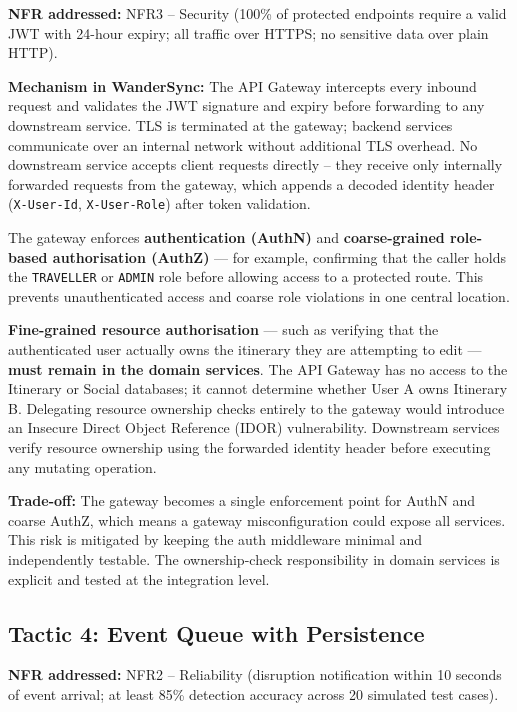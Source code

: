 \documentclass[12pt,a4paper]{article}
\begin{document}
\textbf{NFR addressed:} NFR3 -- Security (100\% of protected endpoints require a valid JWT with
24-hour expiry; all traffic over HTTPS; no sensitive data over plain HTTP).

\textbf{Mechanism in WanderSync:}
The API Gateway intercepts every inbound request and validates the JWT signature and expiry
before forwarding to any downstream service. TLS is terminated at the gateway; backend services
communicate over an internal network without additional TLS overhead. No downstream service
accepts client requests directly -- they receive only internally forwarded requests from the
gateway, which appends a decoded identity header (\texttt{X-User-Id}, \texttt{X-User-Role})
after token validation.

The gateway enforces \textbf{authentication (AuthN)} and \textbf{coarse-grained role-based
authorisation (AuthZ)} — for example, confirming that the caller holds the \texttt{TRAVELLER}
or \texttt{ADMIN} role before allowing access to a protected route. This prevents unauthenticated
access and coarse role violations in one central location.

\textbf{Fine-grained resource authorisation} — such as verifying that the authenticated user
actually owns the itinerary they are attempting to edit — \textbf{must remain in the domain
services}. The API Gateway has no access to the Itinerary or Social databases; it cannot
determine whether User A owns Itinerary B. Delegating resource ownership checks entirely to
the gateway would introduce an Insecure Direct Object Reference (IDOR) vulnerability.
Downstream services verify resource ownership using the forwarded identity header before
executing any mutating operation.

\textbf{Trade-off:} The gateway becomes a single enforcement point for AuthN and coarse AuthZ,
which means a gateway misconfiguration could expose all services. This risk is mitigated by
keeping the auth middleware minimal and independently testable. The ownership-check responsibility
in domain services is explicit and tested at the integration level.

\subsection{Tactic 4: Event Queue with Persistence}

\textbf{NFR addressed:} NFR2 -- Reliability (disruption notification within 10 seconds of event
arrival; at least 85\% detection accuracy across 20 simulated test cases).
\end{document}
